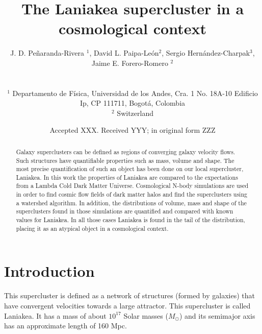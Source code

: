 \documentclass[usenatbib]{mnras}
\title[Laniakea in context]{The Laniakea supercluster in a cosmological context}
\author[Barrera et al.]{
\parbox[t]{\textwidth}{
    {J. D. Pe\~naranda-Rivera $^1$,} 
    {David L.  Paipa-Le\'on$^{2}$,}
    {Sergio Hern\'andez-Charpak$^3$,}\\
    {Jaime E. Forero-Romero $^{2}$}
}
\\\\
$^{1}$ Departamento de F\'isica, Universidad de los Andes, Cra. 1
  No. 18A-10 Edificio Ip, CP 111711, Bogot\'a, Colombia \\
$^{2}$ Switzerland\\
}
\date{Accepted XXX. Received YYY; in original form ZZZ}
\begin{document}
\label{firstpage}
\pagerange{\pageref{firstpage}--\pageref{lastpage}}
\maketitle

\maketitle
\begin{abstract}
Galaxy superclusters can be defined as regions of converging galaxy velocity flows.
Such structures have quantifiable properties such as mass, volume and shape.
The most precise quantification of such an object has been done on our local supercluster, Laniakea. 
In this work the properties of Laniakea are compared to the expectations from a Lambda Cold Dark Matter Universe.
Cosmological N-body simulations are used in order to find cosmic flow fields of dark matter halos and find the superclusters using a watershed algorithm.
In addition, the distributions of volume, mass and shape of the superclusters found in those simulations are quantified and compared with known values for Laniakea.
In all those cases Laniakea is found in the tail of the distribution, placing it as an atypical object in a cosmological context. 
\end{abstract}

\begin{keywords}
\end{keywords}




\section{Introduction}

This supercluster is defined as a network of structures (formed by galaxies) that have convergent velocities towards a large attractor. This supercluster is called Laniakea. It has a mass of about $10^{17}$ Solar masses ($M_{\odot}$) and its semimajor axis has an approximate length of 160 Mpc. 
\end{document}

